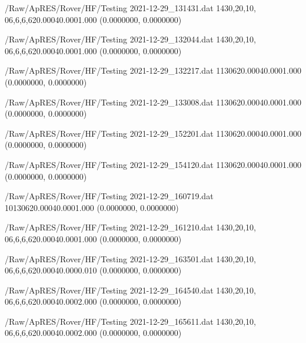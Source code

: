 \hfaprestable
{/Raw/ApRES/Rover/HF/Testing}%
{2021-12-29\_131431.dat}%
{1}{4}{30,20,10, 0}{6,6,6,6}{20.000}{40.000}{1.000}%
{ (0.0000000, 0.0000000)}%
{}%
{}%

\hfaprestable
{/Raw/ApRES/Rover/HF/Testing}%
{2021-12-29\_132044.dat}%
{1}{4}{30,20,10, 0}{6,6,6,6}{20.000}{40.000}{1.000}%
{ (0.0000000, 0.0000000)}%
{}%
{}%

\hfaprestable
{/Raw/ApRES/Rover/HF/Testing}%
{2021-12-29\_132217.dat}%
{1}{1}{30}{6}{20.000}{40.000}{1.000}%
{ (0.0000000, 0.0000000)}%
{}%
{}%

\hfaprestable
{/Raw/ApRES/Rover/HF/Testing}%
{2021-12-29\_133008.dat}%
{1}{1}{30}{6}{20.000}{40.000}{1.000}%
{ (0.0000000, 0.0000000)}%
{}%
{}%

\hfaprestable
{/Raw/ApRES/Rover/HF/Testing}%
{2021-12-29\_152201.dat}%
{1}{1}{30}{6}{20.000}{40.000}{1.000}%
{ (0.0000000, 0.0000000)}%
{}%
{}%

\hfaprestable
{/Raw/ApRES/Rover/HF/Testing}%
{2021-12-29\_154120.dat}%
{1}{1}{30}{6}{20.000}{40.000}{1.000}%
{ (0.0000000, 0.0000000)}%
{}%
{}%

\hfaprestable
{/Raw/ApRES/Rover/HF/Testing}%
{2021-12-29\_160719.dat}%
{10}{1}{30}{6}{20.000}{40.000}{1.000}%
{ (0.0000000, 0.0000000)}%
{}%
{}%

\hfaprestable
{/Raw/ApRES/Rover/HF/Testing}%
{2021-12-29\_161210.dat}%
{1}{4}{30,20,10, 0}{6,6,6,6}{20.000}{40.000}{1.000}%
{ (0.0000000, 0.0000000)}%
{}%
{}%

\hfaprestable
{/Raw/ApRES/Rover/HF/Testing}%
{2021-12-29\_163501.dat}%
{1}{4}{30,20,10, 0}{6,6,6,6}{20.000}{40.000}{0.010}%
{ (0.0000000, 0.0000000)}%
{}%
{}%

\hfaprestable
{/Raw/ApRES/Rover/HF/Testing}%
{2021-12-29\_164540.dat}%
{1}{4}{30,20,10, 0}{6,6,6,6}{20.000}{40.000}{2.000}%
{ (0.0000000, 0.0000000)}%
{}%
{}%

\hfaprestable
{/Raw/ApRES/Rover/HF/Testing}%
{2021-12-29\_165611.dat}%
{1}{4}{30,20,10, 0}{6,6,6,6}{20.000}{40.000}{2.000}%
{ (0.0000000, 0.0000000)}%
{}%
{}%

